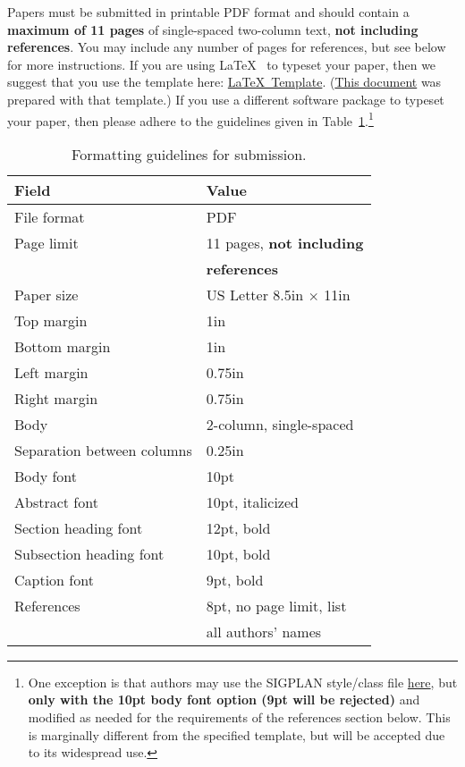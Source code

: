 \documentclass[pageno]{jpaper}
\begin{document}
Papers must be submitted in printable PDF format and should contain a
{\bf maximum of 11 pages} of single-spaced two-column text, {\bf not
  including references}.  You may include any number of pages for
references, but see below for more instructions.  If you are using
\LaTeX~\cite{lamport94} to typeset your paper, then we suggest that
you use the template here:
\href{http://novel.ict.ac.cn/ASPLOS2017/files/asplos17-latex-template.tar.gz}{\LaTeX~Template}.
(\href{http://novel.ict.ac.cn/ASPLOS2017/files/asplos17-template.pdf}{This
  document} was prepared with that template.)  If you use a different
software package to typeset your paper, then please adhere to the
guidelines given in Table~\ref{table:formatting}.\footnote{One
  exception is that authors may use the SIGPLAN style/class file
  \href{http://classic.sigplan.org/sigplanconf.cls}{here}, but {\bf
    only with the 10pt body font option (9pt will be rejected)} and
  modified as needed for the requirements of the references section
  below.  This is marginally different from the specified template,
  but will be accepted due to its widespread use.}

\begin{table}[h!]
  \centering
  \begin{tabular}{|l|l|}
    \hline
    \textbf{Field} & \textbf{Value}\\
    \hline
    \hline
    File format & PDF \\
    \hline
    Page limit & 11 pages, {\bf not including}\\
               & {\bf references}\\
    \hline
    Paper size & US Letter 8.5in $\times$ 11in\\
    \hline
    Top margin & 1in\\
    \hline
    Bottom margin & 1in\\
    \hline
    Left margin & 0.75in\\
    \hline
    Right margin & 0.75in\\
    \hline
    Body & 2-column, single-spaced\\
    \hline
    Separation between columns & 0.25in\\
    \hline
    Body font & 10pt\\
    \hline
    Abstract font & 10pt, italicized\\
    \hline
    Section heading font & 12pt, bold\\
    \hline
    Subsection heading font & 10pt, bold\\
    \hline
    Caption font & 9pt, bold\\
    \hline
    References & 8pt, no page limit, list \\
               & all authors' names\\
    \hline
  \end{tabular}
  \caption{Formatting guidelines for submission. }
  \label{table:formatting}
\end{table}
\end{document}
